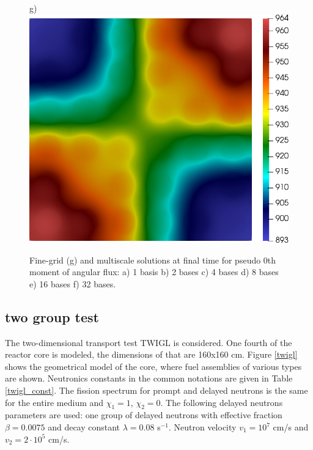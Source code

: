 \documentclass[preprint]{elsarticle}
\begin{document}
\begin{figure}[ht]
		g)\includegraphics[width=0.3\linewidth]{small/u1_f.png}
	\caption{Fine-grid (g) and multiscale solutions at final time for pseudo 0th moment of angular flux: a) 1 basis b) 2 bases c) 4 bases d) 8 bases e) 16 bases f) 32 bases.}
	\label{small_solutions}
\end{figure}

\subsection{two group test}
%

The two-dimensional transport test TWIGL is considered.
One fourth of the reactor core is modeled, the dimensions of that are 160x160 cm.
Figure \ref{twigl} shows the geometrical model of the core, where fuel assemblies of various types are shown.
Neutronics constants in the common notations are given in Table \ref{twigl_const}.
The fission spectrum for prompt and delayed neutrons is the same for the entire medium and $\chi_1 = 1$, $\chi_2 = 0$.
The following delayed neutrons parameters are used: one group of delayed neutrons with eﬀective fraction $\beta = 0.0075$ and decay constant $\lambda = 0.08$ s$^{-1}$. 
Neutron velocity $v_1 = 10^7$ cm/s and $v_2 = 2 \cdot 10^5$ cm/s.
\end{document}
